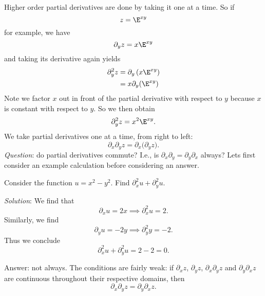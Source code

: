 \M Higher order partial derivatives are done by taking it one at
a time. So if 
\begin{equation}
z=\E^{xy}
\end{equation}
for example, we have
\begin{equation}
\partial_{y}z=x\E^{xy}
\end{equation}
and taking its derivative again yields
\begin{equation}
\begin{aligned}
\partial_{y}^{2}z &= \partial_{y}\left(x\E^{xy}\right)\\
&=x\partial_{y}(\E^{xy})
\end{aligned}
\end{equation}
Note we factor $x$ out in front of the partial derivative with
respect to $y$ because $x$ is constant with respect to $y$. So we
then obtain
\begin{equation}
\partial_{y}^{2}z = x^{2}\E^{xy}.
\end{equation}
We take partial derivatives one at a time, from right to left:
\begin{equation}
\partial_{x}\partial_{y}z
= \partial_{x}\bigl(\partial_{y}z\bigr).
\end{equation}
\emph{Question}: do partial derivatives commute? I.e., is
$\partial_{x}\partial_{y}=\partial_{y}\partial_{x}$ always?
Lets first consider an example calculation before considering an answer.

\begin{example}
Consider the function $u=x^{2}-y^{2}$. Find
$\partial_{x}^{2}u+\partial_{y}^{2}u$.

\emph{Solution}: We find that
\begin{equation}
\partial_{x}u = 2x\implies \partial_{x}^{2}u = 2.
\end{equation}
Similarly, we find
\begin{equation}
\partial_{y}u=-2y\implies \partial_{y}^{2}y=-2.
\end{equation}
Thus we conclude
\begin{equation}
\partial_{x}^{2}u+\partial_{y}^{2}u=2-2=0.
\end{equation}
\end{example}

Answer: not always. The conditions are fairly weak: if
$\partial_{x}z$, $\partial_{y}z$, $\partial_{x}\partial_{y}z$ and
$\partial_{y}\partial_{x}z$ are continuous throughout their
respective domains, then 
\begin{equation}
\partial_{x}\partial_{y}z = \partial_{y}\partial_{x}z.
\end{equation}

